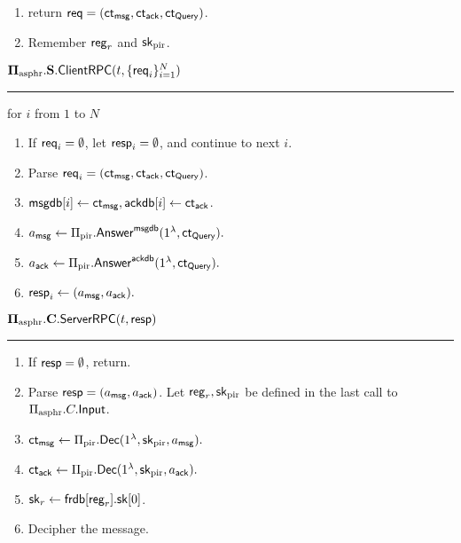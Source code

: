 \begin{definition}
\begin{enumerate}
\begin{itemize}
    \end{itemize}
    \item return $\mathsf{req} = (\mathsf{ct}_{\mathsf{msg}}, \mathsf{ct}_{\mathsf{ack}}, \mathsf{ct}_{\mathsf{Query}})$.
    \item Remember $\mathsf{reg}_r$ and ${\mathsf{sk}}_{\text{pir}}$.
\end{enumerate}
\vspace{10pt}
$\mathbf{\Pi_{\text{asphr}}.S.\mathsf{ClientRPC}}(t, \{\mathsf{req}_i\}_{i = 1}^N)$
\vspace{5pt}
\hrule
\vspace{5pt}
\item for $i$ from $1$ to $N$
\begin{enumerate}
    \item If $\mathsf{req}_i = \emptyset$, let $\mathsf{resp}_i = \emptyset$, and continue to next $i$. 
    \item Parse $\mathsf{req}_i = (\mathsf{ct}_{\mathsf{msg}}, \mathsf{ct}_{\mathsf{ack}}, \mathsf{ct}_{\mathsf{Query}})$.
    \item $\mathsf{msgdb}[i] \leftarrow \mathsf{ct}_{\mathsf{msg}}, \mathsf{ackdb}[i] \leftarrow \mathsf{ct}_{\mathsf{ack}}$.
    \item $a_{\mathsf{msg}} \leftarrow \Pi_{\text{pir}}.\mathsf{Answer}^{\mathsf{msgdb}}(1^{\lambda}, \mathsf{ct}_{\mathsf{Query}}).$
    \item $a_{\mathsf{ack}} \leftarrow \Pi_{\text{pir}}.\mathsf{Answer}^{\mathsf{ackdb}}(1^{\lambda}, \mathsf{ct}_{\mathsf{Query}}).$
    \item $\mathsf{resp}_i \leftarrow (a_{\mathsf{msg}}, a_{\mathsf{ack}}).$
\end{enumerate}
\vspace{10pt}
$\mathbf{\Pi_{\text{asphr}}.C.\mathsf{ServerRPC}}(t, \mathsf{resp})$
\vspace{5pt}
\hrule
\vspace{5pt}
\begin{enumerate}
    \item If $\mathsf{resp} = \emptyset$, return.
    \item Parse $\mathsf{resp} = (a_{\mathsf{msg}}, a_{\mathsf{ack}})$. Let $\mathsf{reg}_r, {\mathsf{sk}}_{\text{pir}}$ be defined in the last call to $\Pi_{\text{asphr}}.C.\mathsf{Input}$.
    \item $\mathsf{ct}_{\mathsf{msg}} \leftarrow \Pi_{\text{pir}}.\mathsf{Dec}(1^{\lambda}, {\mathsf{sk}}_{\text{pir}}, a_{\mathsf{msg}}).$
    \item $\mathsf{ct}_{\mathsf{ack}} \leftarrow \Pi_{\text{pir}}.\mathsf{Dec}(1^{\lambda}, {\mathsf{sk}}_{\text{pir}}, a_{\mathsf{ack}}).$
    \item ${\mathsf{sk}}_{r} \leftarrow \mathsf{frdb}[\mathsf{reg}_r].{\mathsf{sk}}[0]$.
    \item Decipher the message.

\end{enumerate}
\end{definition}

